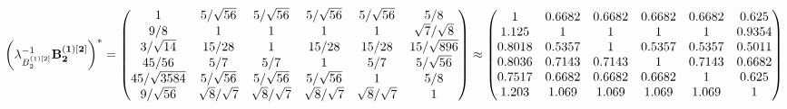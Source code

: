 \documentclass[10pt,a4paper]{article}
\begin{document}
	\[
		\left(\lambda_{B_2^{(1)[2]}}^{-1}\bold{B_2^{(1)[2]}}\right)^* = 
		\begin{pmatrix}
			{1}{} & {{5}} / {\sqrt{56}} & {{5}} / {\sqrt{56}} & {{5}} / {\sqrt{56}} & {{5}} / {\sqrt{56}} & {{5}} / {{8}} \\
			{{9}} / {{8}} & {1}{} & {1}{} & {1}{} & {1}{} & {\sqrt{7}} / {\sqrt{8}} \\
			{{3}} / {\sqrt{14}} & {{15}} / {{28}} & {1}{} & {{15}} / {{28}} & {{15}} / {{28}} & {{15}} / {\sqrt{896}} \\
			{{45}} / {{56}} & {{5}} / {{7}} & {{5}} / {{7}} & {1}{} & {{5}} / {{7}} & {{5}} / {\sqrt{56}} \\
			{{45}} / {\sqrt{3584}} & {{5}} / {\sqrt{56}} & {{5}} / {\sqrt{56}} & {{5}} / {\sqrt{56}} & {1}{} & {{5}} / {{8}} \\
			{{9}} / {\sqrt{56}} & {\sqrt{8}} / {\sqrt{7}} & {\sqrt{8}} / {\sqrt{7}} & {\sqrt{8}} / {\sqrt{7}} & {\sqrt{8}} / {\sqrt{7}} & {1}{} \\
		\end{pmatrix}
		\approx
		\begin{pmatrix}
			1        & 0.6682   & 0.6682   & 0.6682   & 0.6682   & 0.625    \\
			1.125    & 1        & 1        & 1        & 1        & 0.9354   \\
			0.8018   & 0.5357   & 1        & 0.5357   & 0.5357   & 0.5011   \\
			0.8036   & 0.7143   & 0.7143   & 1        & 0.7143   & 0.6682   \\
			0.7517   & 0.6682   & 0.6682   & 0.6682   & 1        & 0.625    \\
			1.203    & 1.069    & 1.069    & 1.069    & 1.069    & 1        \\
		\end{pmatrix}
	\]
\end{document}
